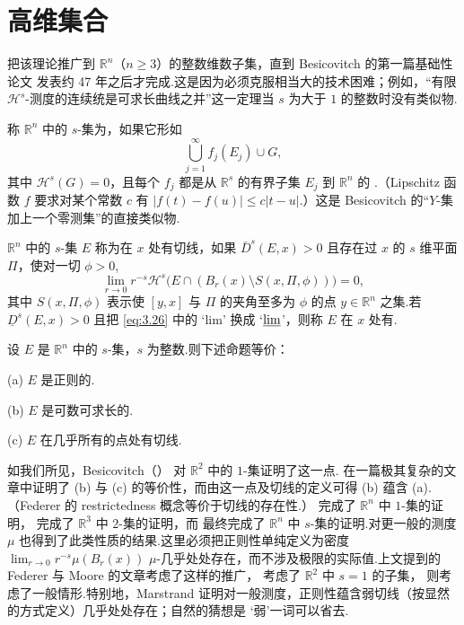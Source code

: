 \section{高维集合}

把该理论推广到 $\mathbb{R}^n$（$n\geq 3$）的整数维数子集，直到 Besicovitch 的第一篇基础性论文 \citeyear{besicovitch1928a} 发表约 47 年之后才完成.这是因为必须克服相当大的技术困难；例如，``有限 $\mathcal{H}^s$-测度的连续统是可求长曲线之并''这一定理当 $s$ 为大于 $1$ 的整数时没有类似物.

称 $\mathbb{R}^n$ 中的 $s$-集为，如果它形如
\[
  \bigcup_{j=1}^{\infty}f_j(E_j)\cup G,
\]
其中 $\mathcal{H}^s(G)=0$，且每个 $f_j$ 都是从 $\mathbb{R}^s$ 的有界子集 $E_j$ 到 $\mathbb{R}^n$ 的 .（Lipschitz 函数 $f$ 要求对某个常数 $c$ 有 $|f(t)-f(u)|\leq c|t-u|$.）这是 Besicovitch 的``$Y$-集加上一个零测集''的直接类似物.

$\mathbb{R}^n$ 中的 $s$-集 $E$ 称为在 $x$ 处有切线，如果 $\bar{D}^s(E,x)>0$ 且存在过 $x$ 的 $s$ 维平面 $\Pi$，使对一切 $\phi>0$,
\begin{equation}\label{eq:3.26}
  \lim_{r\to 0}r^{-s}\mathcal{H}^{s}\bigl(E\cap(B_r(x)\setminus S(x,\Pi,\phi))\bigr)=0,
\end{equation}
其中 $S(x,\Pi,\phi)$ 表示使 $[y,x]$ 与 $\Pi$ 的夹角至多为 $\phi$ 的点 $y\in\mathbb{R}^n$ 之集.若 $\underline{D}^s(E,x)>0$ 且把 \eqref{eq:3.26} 中的 `lim' 换成 `$\varliminf$'，则称 $E$ 在 $x$ 处有.

\begin{theorem}\label{thm:3.33}
设 $E$ 是 $\mathbb{R}^n$ 中的 $s$-集，$s$ 为整数.则下述命题等价：

(a) $E$ 是正则的.

(b) $E$ 是可数可求长的.

(c) $E$ 在几乎所有的点处有切线.
\end{theorem}

如我们所见，Besicovitch（\citeyear{besicovitch1928a,besicovitch1938}） 对 $\mathbb{R}^2$ 中的 $1$-集证明了这一点.\textcite{federer1947} 在一篇极其复杂的文章中证明了 (b) 与 (c) 的等价性，而由这一点及切线的定义可得 (b) 蕴含 (a).（Federer 的 restrictedness 概念等价于切线的存在性.）\textcite{moore1950} 完成了 $\mathbb{R}^n$ 中 $1$-集的证明，\textcite{marstrand1961} 完成了 $\mathbb{R}^3$ 中 $2$-集的证明，而 \textcite{mattila1975a} 最终完成了 $\mathbb{R}^n$ 中 $s$-集的证明.对更一般的测度 $\mu$ 也得到了此类性质的结果.这里必须把正则性单纯定义为密度 $\lim_{r\to 0}r^{-s}\mu(B_r(x))$ $\mu$-几乎处处存在，而不涉及极限的实际值.上文提到的 Federer 与 Moore 的文章考虑了这样的推广，\textcite{morserandolph1944} 考虑了 $\mathbb{R}^2$ 中 $s=1$ 的子集，\textcite{marstrand1964} 则考虑了一般情形.特别地，Marstrand 证明对一般测度，正则性蕴含弱切线（按显然的方式定义）几乎处处存在；自然的猜想是 `弱'一词可以省去.

